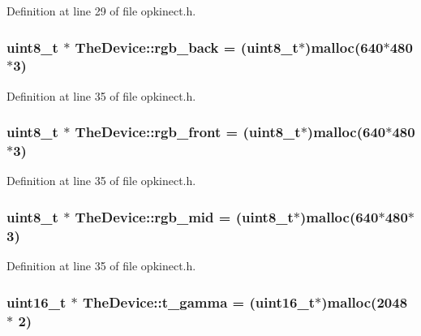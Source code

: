 Definition at line 29 of file opkinect.\+h.

\hypertarget{class_the_device_a891e436e57a14948d2a86f7b0176d4c6}{
\subsubsection[{rgb\+\_\+back}]{\setlength{\rightskip}{0pt plus 5cm}uint8\+\_\+t $\ast$ The\+Device\+::rgb\+\_\+back = (uint8\+\_\+t$\ast$)malloc(640$\ast$480$\ast$3)\hspace{0.3cm}{\ttfamily [static]}}}\label{class_the_device_a891e436e57a14948d2a86f7b0176d4c6}


Definition at line 35 of file opkinect.\+h.

\hypertarget{class_the_device_a996a11e8402b9ac9893a8ff7de033a28}{
\subsubsection[{rgb\+\_\+front}]{\setlength{\rightskip}{0pt plus 5cm}uint8\+\_\+t $\ast$ The\+Device\+::rgb\+\_\+front = (uint8\+\_\+t$\ast$)malloc(640$\ast$480$\ast$3)\hspace{0.3cm}{\ttfamily [static]}}}\label{class_the_device_a996a11e8402b9ac9893a8ff7de033a28}


Definition at line 35 of file opkinect.\+h.

\hypertarget{class_the_device_a9f2536b80117cf3b969b5b73dfcda9c9}{
\subsubsection[{rgb\+\_\+mid}]{\setlength{\rightskip}{0pt plus 5cm}uint8\+\_\+t $\ast$ The\+Device\+::rgb\+\_\+mid = (uint8\+\_\+t$\ast$)malloc(640$\ast$480$\ast$3)\hspace{0.3cm}{\ttfamily [static]}}}\label{class_the_device_a9f2536b80117cf3b969b5b73dfcda9c9}


Definition at line 35 of file opkinect.\+h.

\hypertarget{class_the_device_afc5f9b8496261c692b5b42d0bf4fe564}{
\subsubsection[{t\+\_\+gamma}]{\setlength{\rightskip}{0pt plus 5cm}uint16\+\_\+t $\ast$ The\+Device\+::t\+\_\+gamma = (uint16\+\_\+t$\ast$)malloc(2048 $\ast$ 2)\hspace{0.3cm}{\ttfamily [static]}}}\label{class_the_device_afc5f9b8496261c692b5b42d0bf4fe564}


